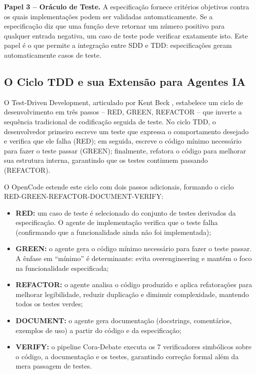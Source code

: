 \documentclass[12pt,a4paper,sumario=tradicional,openany]{abntex2}
\begin{document}
\textbf{Papel 3 -- Oráculo de Teste.} A especificação fornece critérios objetivos contra os quais implementações podem ser validadas automaticamente. Se a especificação diz que uma função deve retornar um número positivo para qualquer entrada negativa, um caso de teste pode verificar exatamente isto. Este papel é o que permite a integração entre SDD e TDD: especificações geram automaticamente casos de teste.

\subsection{O Ciclo TDD e sua Extensão para Agentes IA}

O Test-Driven Development, articulado por Kent Beck \cite{beck2003tdd}, estabelece um ciclo de desenvolvimento em três passos -- RED, GREEN, REFACTOR -- que inverte a sequência tradicional de codificação seguida de teste. No ciclo TDD, o desenvolvedor primeiro escreve um teste que expressa o comportamento desejado e verifica que ele falha (RED); em seguida, escreve o código mínimo necessário para fazer o teste passar (GREEN); finalmente, refatora o código para melhorar sua estrutura interna, garantindo que os testes continuem passando (REFACTOR).

O OpenCode estende este ciclo com dois passos adicionais, formando o ciclo RED-GREEN-REFACTOR-DOCUMENT-VERIFY:

\begin{itemize}
    \item \textbf{RED:} um caso de teste é selecionado do conjunto de testes derivados da especificação. O agente de implementação verifica que o teste falha (confirmando que a funcionalidade ainda não foi implementada);
    \item \textbf{GREEN:} o agente gera o código mínimo necessário para fazer o teste passar. A ênfase em ``mínimo'' é determinante: evita overengineering e mantém o foco na funcionalidade especificada;
    \item \textbf{REFACTOR:} o agente analisa o código produzido e aplica refatorações para melhorar legibilidade, reduzir duplicação e diminuir complexidade, mantendo todos os testes verdes;
    \item \textbf{DOCUMENT:} o agente gera documentação (docstrings, comentários, exemplos de uso) a partir do código e da especificação;
    \item \textbf{VERIFY:} o pipeline Cora-Debate executa os 7 verificadores simbólicos sobre o código, a documentação e os testes, garantindo correção formal além da mera passagem de testes.
\end{itemize}
\end{document}
